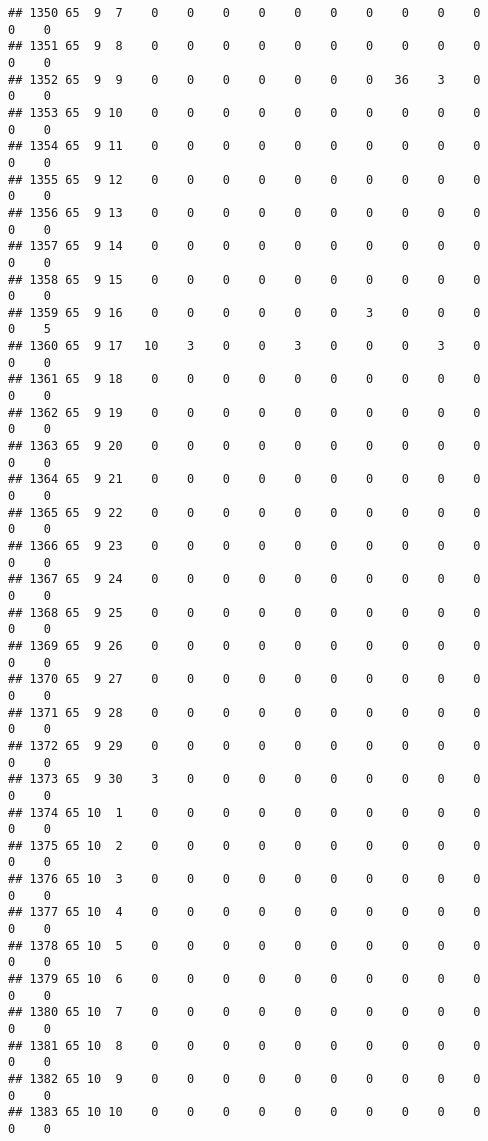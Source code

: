 \documentclass[]{article}
\begin{document}
\begin{verbatim}
## 1350 65  9  7    0    0    0    0    0    0    0    0    0    0    0    0
## 1351 65  9  8    0    0    0    0    0    0    0    0    0    0    0    0
## 1352 65  9  9    0    0    0    0    0    0    0   36    3    0    0    0
## 1353 65  9 10    0    0    0    0    0    0    0    0    0    0    0    0
## 1354 65  9 11    0    0    0    0    0    0    0    0    0    0    0    0
## 1355 65  9 12    0    0    0    0    0    0    0    0    0    0    0    0
## 1356 65  9 13    0    0    0    0    0    0    0    0    0    0    0    0
## 1357 65  9 14    0    0    0    0    0    0    0    0    0    0    0    0
## 1358 65  9 15    0    0    0    0    0    0    0    0    0    0    0    0
## 1359 65  9 16    0    0    0    0    0    0    3    0    0    0    0    5
## 1360 65  9 17   10    3    0    0    3    0    0    0    3    0    0    0
## 1361 65  9 18    0    0    0    0    0    0    0    0    0    0    0    0
## 1362 65  9 19    0    0    0    0    0    0    0    0    0    0    0    0
## 1363 65  9 20    0    0    0    0    0    0    0    0    0    0    0    0
## 1364 65  9 21    0    0    0    0    0    0    0    0    0    0    0    0
## 1365 65  9 22    0    0    0    0    0    0    0    0    0    0    0    0
## 1366 65  9 23    0    0    0    0    0    0    0    0    0    0    0    0
## 1367 65  9 24    0    0    0    0    0    0    0    0    0    0    0    0
## 1368 65  9 25    0    0    0    0    0    0    0    0    0    0    0    0
## 1369 65  9 26    0    0    0    0    0    0    0    0    0    0    0    0
## 1370 65  9 27    0    0    0    0    0    0    0    0    0    0    0    0
## 1371 65  9 28    0    0    0    0    0    0    0    0    0    0    0    0
## 1372 65  9 29    0    0    0    0    0    0    0    0    0    0    0    0
## 1373 65  9 30    3    0    0    0    0    0    0    0    0    0    0    0
## 1374 65 10  1    0    0    0    0    0    0    0    0    0    0    0    0
## 1375 65 10  2    0    0    0    0    0    0    0    0    0    0    0    0
## 1376 65 10  3    0    0    0    0    0    0    0    0    0    0    0    0
## 1377 65 10  4    0    0    0    0    0    0    0    0    0    0    0    0
## 1378 65 10  5    0    0    0    0    0    0    0    0    0    0    0    0
## 1379 65 10  6    0    0    0    0    0    0    0    0    0    0    0    0
## 1380 65 10  7    0    0    0    0    0    0    0    0    0    0    0    0
## 1381 65 10  8    0    0    0    0    0    0    0    0    0    0    0    0
## 1382 65 10  9    0    0    0    0    0    0    0    0    0    0    0    0
## 1383 65 10 10    0    0    0    0    0    0    0    0    0    0    0    0

\end{verbatim}
\end{document}
